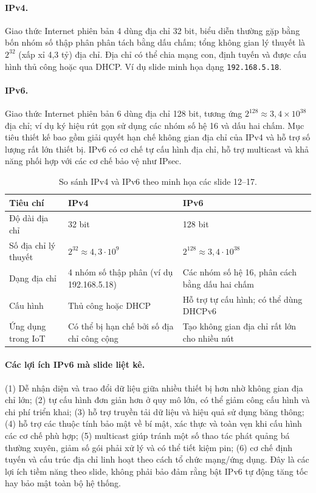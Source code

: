 \paragraph{IPv4.} Giao thức Internet phiên bản 4 dùng địa chỉ 32 bit, biểu diễn thường gặp bằng bốn nhóm số thập phân phân tách bằng dấu chấm; tổng không gian lý thuyết là $2^{32}$ (xấp xỉ 4,3 tỷ) địa chỉ. Địa chỉ có thể chia mạng con, định tuyến và được cấu hình thủ công hoặc qua DHCP. Ví dụ slide minh họa dạng \texttt{192.168.5.18}. 

\paragraph{IPv6.} Giao thức Internet phiên bản 6 dùng địa chỉ 128 bit, tương ứng $2^{128}\approx 3{,}4\times 10^{38}$ địa chỉ; ví dụ ký hiệu rút gọn sử dụng các nhóm số hệ 16 và dấu hai chấm. Mục tiêu thiết kế bao gồm giải quyết hạn chế không gian địa chỉ của IPv4 và hỗ trợ số lượng rất lớn thiết bị. IPv6 có cơ chế tự cấu hình địa chỉ, hỗ trợ multicast và khả năng phối hợp với các cơ chế bảo vệ như IPsec. 

\begin{table}[htbp]\centering\small
\caption{So sánh IPv4 và IPv6 theo minh họa các slide 12--17.}
\begin{tabularx}{\textwidth}{p{3.15cm}XX}\toprule
Tiêu chí & IPv4 & IPv6\\\midrule
Độ dài địa chỉ & 32 bit & 128 bit\\
Số địa chỉ lý thuyết & $2^{32}\approx4{,}3\cdot10^9$ & $2^{128}\approx3{,}4\cdot10^{38}$\\
Dạng địa chỉ & 4 nhóm số thập phân (ví dụ 192.168.5.18) & Các nhóm số hệ 16, phân cách bằng dấu hai chấm\\
Cấu hình & Thủ công hoặc DHCP & Hỗ trợ tự cấu hình; có thể dùng DHCPv6\\
Ứng dụng trong IoT & Có thể bị hạn chế bởi số địa chỉ công cộng & Tạo không gian địa chỉ rất lớn cho nhiều nút\\\bottomrule
\end{tabularx}\end{table}

\paragraph{Các lợi ích IPv6 mà slide liệt kê.} (1) Dễ nhận diện và trao đổi dữ liệu giữa nhiều thiết bị hơn nhờ không gian địa chỉ lớn; (2) tự cấu hình đơn giản hơn ở quy mô lớn, có thể giảm công cấu hình và chi phí triển khai; (3) hỗ trợ truyền tải dữ liệu và hiệu quả sử dụng băng thông; (4) hỗ trợ các thuộc tính bảo mật về bí mật, xác thực và toàn vẹn khi cấu hình các cơ chế phù hợp; (5) multicast giúp tránh một số thao tác phát quảng bá thường xuyên, giảm số gói phải xử lý và có thể tiết kiệm pin; (6) cơ chế định tuyến và cấu trúc địa chỉ linh hoạt theo cách tổ chức mạng/ứng dụng. Đây là các lợi ích tiềm năng theo slide, không phải bảo đảm rằng bật IPv6 tự động tăng tốc hay bảo mật toàn bộ hệ thống. 


